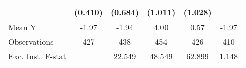 {\begin{tabular}{l*{5}{c}}
            &     (0.410)         &     (0.684)         &     (1.011)         &     (1.028)         &                     \\
\midrule
Mean Y      &       -1.97         &       -1.94         &        4.00         &        0.57         &       -1.97         \\
Observations&         427         &         438         &         454         &         426         &         410         \\
Exc. Inst. F-stat&                     &      22.549         &      48.549         &      62.899         &       1.148         \\
\bottomrule
\end{tabular}
}
